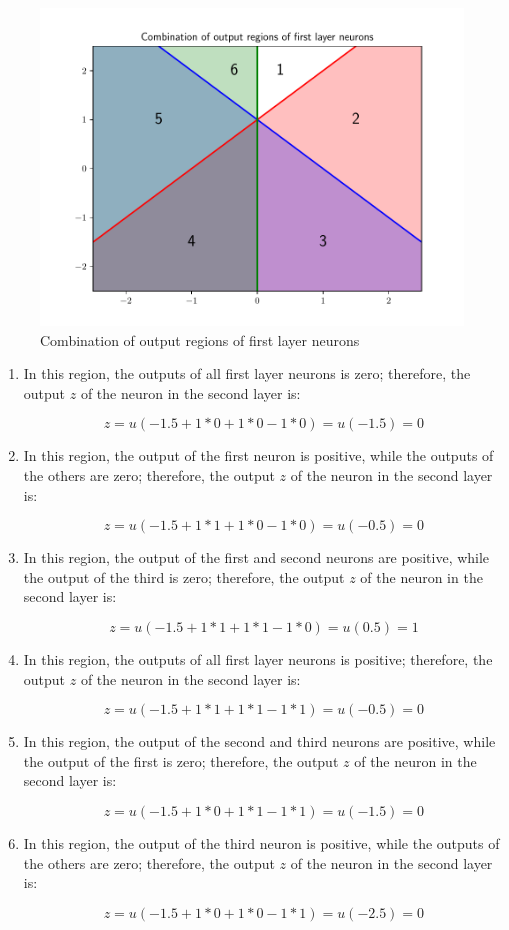 \documentclass[letterpaper,headings=standardclasses]{scrartcl}
\begin{document}
\begin{figure}[h]
\centering
\includegraphics[width=0.7\linewidth]{first_layer_out_all.pdf}
\caption{Combination of output regions of first layer neurons}
\label{first_layer_out_all}
\end{figure}

\begin{enumerate}

\item In this region, the outputs of all first layer neurons is zero; therefore, the output $z$ of the neuron in the second layer is:

$$ z = u(-1.5 + 1 * 0 + 1 * 0 - 1 * 0) = u(-1.5) = 0 $$

\item In this region, the output of the first neuron is positive, while the outputs of the others are zero; therefore, the output $z$ of the neuron in the second layer is:

$$ z = u(-1.5 + 1 * 1 + 1 * 0 - 1 * 0) = u(-0.5) = 0 $$

\item In this region, the output of the first and second neurons are positive, while the output of the third is zero; therefore, the output $z$ of the neuron in the second layer is:

$$ z = u(-1.5 + 1 * 1 + 1 * 1 - 1 * 0) = u(0.5) = 1 $$

\item In this region, the outputs of all first layer neurons is positive; therefore, the output $z$ of the neuron in the second layer is:

$$ z = u(-1.5 + 1 * 1 + 1 * 1 - 1 * 1) = u(-0.5) = 0 $$

\item In this region, the output of the second and third neurons are positive, while the output of the first is zero; therefore, the output $z$ of the neuron in the second layer is:

$$ z = u(-1.5 + 1 * 0 + 1 * 1 - 1 * 1) = u(-1.5) = 0 $$

\item In this region, the output of the third neuron is positive, while the outputs of the others are zero; therefore, the output $z$ of the neuron in the second layer is:

$$ z = u(-1.5 + 1 * 0 + 1 * 0 - 1 * 1) = u(-2.5) = 0 $$

\end{enumerate}
\end{document}
